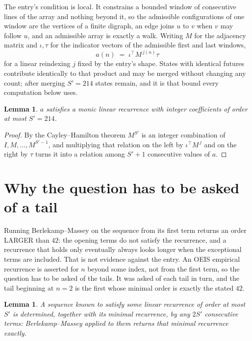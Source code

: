 \documentclass[11pt,a4paper]{article}
\theoremstyle{plain}
\newtheorem{lemma}[theorem]{Lemma}
\theoremstyle{definition}
\begin{document}
The entry's condition is local. It constrains a bounded window of consecutive lines of the
array and nothing beyond it, so the admissible configurations of one window are the vertices of
a finite digraph, an edge joins $u$ to $v$ when $v$ may follow $u$, and an admissible array is
exactly a walk. Writing $M$ for the adjacency matrix and $\iota,\tau$ for the indicator vectors
of the admissible first and last windows,
\[
a(n)\;=\;\iota^{\!\top}M^{\,j(n)}\tau
\]
for a linear reindexing $j$ fixed by the entry's shape. States with identical futures
contribute identically to that product and may be merged without changing any count; after
merging $S'=214$ states remain, and it is that bound every computation below uses.

\begin{lemma}\label{lem:cf}
$a$ satisfies a monic linear recurrence with integer coefficients of order at most $S'=214$.
\end{lemma}

\begin{proof}
By the Cayley--Hamilton theorem $M^{S'}$ is an integer combination of $I,M,\dots,M^{S'-1}$,
and multiplying that relation on the left by $\iota^{\!\top}M^{\,j}$ and on the right by
$\tau$ turns it into a relation among $S'+1$ consecutive values of $a$.
\end{proof}

\section{Why the question has to be asked of a tail}

Running Berlekamp--Massey on the sequence from its first term returns an order LARGER than $42$: the opening terms do not satisfy the recurrence, and a recurrence that holds only eventually always looks longer when the exceptional terms are included. That is not evidence against the entry. An OEIS empirical recurrence is asserted for $n$ beyond some index, not from the first term, so the question has to be asked of the tails. It was asked of each tail in turn, and the tail beginning at $n=2$ is the first whose minimal order is exactly the stated $42$.

\begin{lemma}\label{lem:bm}
A sequence known to satisfy some linear recurrence of order at most $S'$ is determined,
together with its minimal recurrence, by any $2S'$ consecutive terms: Berlekamp--Massey applied
to them returns that minimal recurrence exactly.
\end{lemma}
\end{document}
